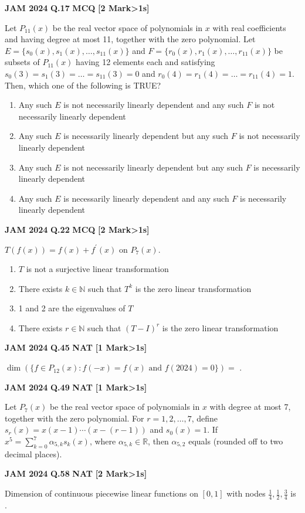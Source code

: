 \documentclass[11pt,a4paper]{article}
\newcommand{\pyqheader}[4]{%
    \noindent\begin{tcolorbox}[
        colback=badgebg,
        colframe=secondary,
        arc=2mm,
        boxrule=0.6pt,
        top=1.5mm,bottom=1.5mm,left=2mm,right=2mm
    ]
        \textbf{\textcolor{primary}{JAM #1}} \hfill \textbf{Q.#2} \hfill \textsc{\textbf{#3}} \hfill \textbf{[#4 Mark\ifnum#4>1s\fi]}
    \end{tcolorbox}\vspace{-1mm}
}
\begin{document}
\pyqheader{2024}{17}{MCQ}{2}
Let $P_{11}(x)$ be the real vector space of polynomials in $x$ with real coefficients and having degree at most 11, together with the zero polynomial. Let $E=\{s_0(x), s_1(x), \dots, s_{11}(x)\}$ and $F=\{r_0(x), r_1(x), \dots, r_{11}(x)\}$ be subsets of $P_{11}(x)$ having 12 elements each and satisfying $s_0(3)=s_1(3)=\dots=s_{11}(3)=0$ and $r_0(4)=r_1(4)=\dots=r_{11}(4)=1$. Then, which one of the following is TRUE?
\begin{enumerate}[label=(\Alph*)]
    \item Any such $E$ is not necessarily linearly dependent and any such $F$ is not necessarily linearly dependent
    \item Any such $E$ is necessarily linearly dependent but any such $F$ is not necessarily linearly dependent
    \item Any such $E$ is not necessarily linearly dependent but any such $F$ is necessarily linearly dependent
    \item Any such $E$ is necessarily linearly dependent and any such $F$ is necessarily linearly dependent
\end{enumerate}

\pyqheader{2024}{22}{MCQ}{2}
$T(f(x))=f(x)+f^{\prime}(x)$ on $P_{7}(x)$.
\begin{enumerate}[label=(\Alph*)]
    \item $T$ is not a surjective linear transformation
    \item There exists $k\in\mathbb{N}$ such that $T^k$ is the zero linear transformation
    \item 1 and 2 are the eigenvalues of $T$
    \item There exists $r\in\mathbb{N}$ such that $(T-I)^{r}$ is the zero linear transformation
\end{enumerate}

\pyqheader{2024}{45}{NAT}{1}
$\dim(\{f\in P_{12}(x): f(-x)=f(x) \text{ and } f(2024)=0\})=$ \underline{\hspace{1.5cm}}.

\pyqheader{2024}{49}{NAT}{1}
Let $P_7(x)$ be the real vector space of polynomials in $x$ with degree at most 7, together with the zero polynomial. For $r=1,2,\dots,7$, define $s_r(x)=x(x-1)\cdots(x-(r-1))$ and $s_0(x)=1$. If $x^{5}=\sum_{k=0}^{7}\alpha_{5,k}s_k(x)$, where $\alpha_{5,k}\in\mathbb{R}$, then $\alpha_{5,2}$ equals \underline{\hspace{1.5cm}} (rounded off to two decimal places).

\pyqheader{2024}{58}{NAT}{2}
Dimension of continuous piecewise linear functions on $[0,1]$ with nodes $\frac{1}{4}, \frac{1}{2}, \frac{3}{4}$ is \underline{\hspace{1.5cm}}.
\end{document}
